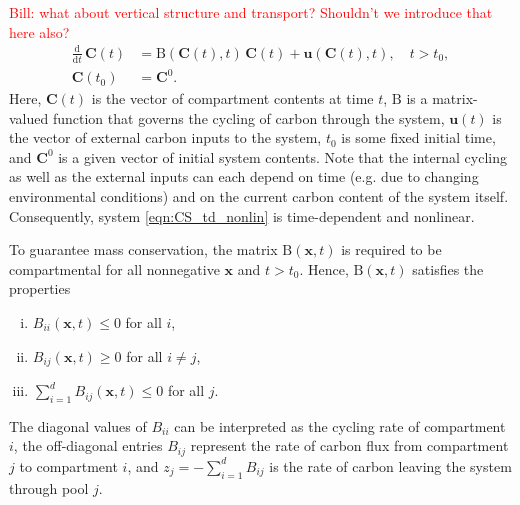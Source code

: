 \documentclass[11pt,a4paper]{article}
\newcommand{\red}[1]{\textcolor{red}{#1}}
\renewcommand{\vec}[1]{\mathbf{#1}}
\newcommand{\tens}[1]{\mathrm{#1}}
\newcommand{\deriv}[1]{\frac{\mathrm{d}}{\mathrm{d}#1}}
\newcommand{\suml}{\sum\limits}
\begin{document}
    \red{Bill: what about vertical structure and transport? Shouldn't we introduce that here also?}
    \begin{equation}\label{eqn:CS_td_nonlin}
        \begin{aligned}
            \deriv{t}\,\vec{C}(t) &= \tens{B}(\vec{C}(t),t)\,\vec{C}(t) + \vec{u}(\vec{C}(t),t),\quad t>t_0,\\
            \vec{C}(t_0) &= \vec{C}^0.
        \end{aligned}
    \end{equation}
Here, $\vec{C}(t)$ is the vector of compartment contents at time $t$, $\tens{B}$ is a matrix-valued function that governs the cycling of carbon through the system, $\vec{u}(t)$ is the vector of external carbon inputs to the system, $t_0$ is some fixed initial time, and $\vec{C}^0$ is a given vector  of initial system contents. Note that the internal cycling as well as the external inputs can each depend on time (e.g. due to changing environmental conditions) and on the current carbon content of the system itself. Consequently, system \eqref{eqn:CS_td_nonlin} is time-dependent and nonlinear.
    
    To guarantee mass conservation, the matrix $\tens{B}(\vec{x},t)$ is required to be compartmental   for all nonnegative $\vec{x}$ and $t>t_0$.
    Hence, $\tens{B}(\vec{x},t)$ satisfies the properties
    \begin{enumerate}[(i)]
        \item $B_{ii}(\vec{x},t)\leq0$ for all $i$,
        \item $B_{ij}(\vec{x},t)\geq0$ for all $i\neq j$,
        \item $\suml_{i=1}^d B_{ij}(\vec{x},t)\leq0$ for all $j$.
    \end{enumerate}
    The diagonal values of $B_{ii}$ can be interpreted as the cycling rate of compartment $i$, the off-diagonal entries $B_{ij}$ represent the rate of carbon flux from compartment $j$ to compartment $i$, and $z_j=-\sum_{i=1}^d B_{ij}$ is the rate of carbon leaving the system through pool $j$.
    
\end{document}
